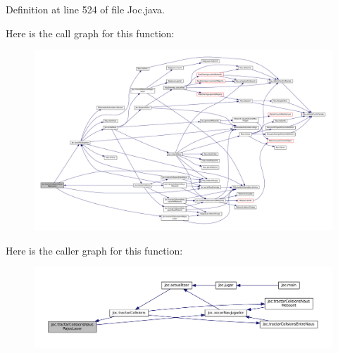 Definition at line 524 of file Joc.\+java.



Here is the call graph for this function\+:
\nopagebreak
\begin{figure}[H]
\begin{center}
\leavevmode
\includegraphics[width=350pt]{class_joc_a9ccc5adec1e7efdd6c01ba393d3686c6_cgraph}
\end{center}
\end{figure}




Here is the caller graph for this function\+:
\nopagebreak
\begin{figure}[H]
\begin{center}
\leavevmode
\includegraphics[width=350pt]{class_joc_a9ccc5adec1e7efdd6c01ba393d3686c6_icgraph}
\end{center}
\end{figure}


\hypertarget{class_joc_a9a3116242cc69985726f4825be70a9b5}{}
